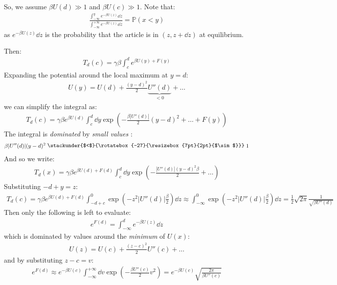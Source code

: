 \documentclass[../template.tex]{subfiles}
\begin{document}
So, we assume $\beta U(d) \gg 1$ and $\beta U(c) \gg 1$.  Note that:
\begin{align*}
    \frac{\displaystyle\int_{-\infty}^y e^{-\beta U(z)} \dd{z}}
    {\displaystyle \int_{-\infty}^{+\infty} e^{- \beta U(z)} \dd{z}} = \mathbb{P}(x < y)
\end{align*}
as $e^{-\beta U(z)}\dd{z}$ is the probability that the article is in $(z,z+\dd{z})$ at equilibrium.

Then:
\begin{align*}
    T_d (c) = \gamma \beta \int_c^d e^{\beta U(y) + F(y)}
\end{align*}
Expanding the potential around the local maximum at $y=d$:
\begin{align*}
    U(y) = U(d) + \frac{(y-d)^2}{2} \underbrace{U''(d)}_{< 0} + \dots  
\end{align*}
we can simplify the integral as:
\begin{align*}
    T_d(c) = \gamma \beta e^{\beta U(d)} \int_c^d \dd{y} \exp\left({-\frac{\beta |U''(d)|}{2}  (y-d)^2 + \dots + F(y)}\right)
\end{align*}
The integral is \textit{dominated} by \textit{small values }:
\begin{align*}
    \beta |U''(d)| (y-d)^2 \mathrel{\raisebox{1pt}{\stackunder{$<$}{\rotatebox{-27}{\resizebox{7pt}{2pt}{$\sim$}}}}} 1
\end{align*}   
And so we write:
\begin{align*}
    T_d(x) = \gamma \beta e^{\beta U(d) + F(d)} \int_c^d \dd{y} \exp\left(-\frac{|U''(d)|(y-d)^2 \beta}{2} + \dots\right)
\end{align*}
Substituting $-d + y = z$:
\begin{align*}
    T_d(c) = \gamma \beta e^{\beta U(d) + F(d)} \int_{-d + c}^0 \exp \left({-z^2 |U''(d)|}\frac{\beta }{2} \right) \dd{z} \approx \int_{-\infty}^0 \exp\left(-z^2 |U''(d)| \frac{\beta}{2} \right) \dd{z} = \frac{1}{2} \sqrt{2 \pi} \frac{1}{\sqrt{ \beta U''(d) }}  
\end{align*} 
Then only the following is left to evaluate:
\begin{align*}
    e^{F(d)} = \int_{-\infty}^d e^{-\beta U(z) } \dd{z}
\end{align*}
which is dominated by values around the \textit{minimum} of $U(x)$:
\begin{align*}
    U(z) = U(c) + \frac{(z-c)^2}{2} U''(c) + \dots 
\end{align*}  
and by substituting $z-c = v$:
\begin{align*}
    e^{F(d)} \approx e^{-\beta U(c)} \int_{-\infty}^{+\infty} \dd{v} \exp(-\frac{\beta U''(c)}{2} v^2 ) = e^{- \beta U(c)} \sqrt{\frac{2\pi}{\beta U''(c)} }
\end{align*}
\end{document}
